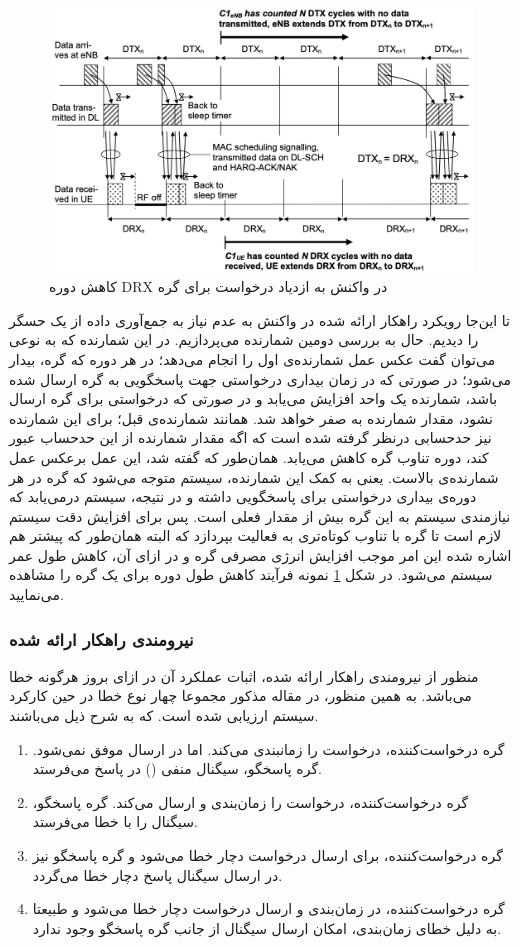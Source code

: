 \begin{figure}
	\centering
	\includegraphics[width=0.7\linewidth]{figs/cdd-extend}
	\caption {کاهش دوره DRX در واکنش به ازدیاد درخواست برای گره}
	\label{fig:cdd-reduce}
\end{figure}

\par
تا این‌جا رویکرد راهکار ارائه شده در واکنش به عدم نیاز به جمع‌آوری داده از یک حسگر را دیدیم. حال به بررسی دومین شمارنده می‌پردازیم. در این شمارنده که به نوعی می‌توان گفت عکس عمل شمارنده‌ی اول را انجام می‌دهد؛ در هر دوره که گره، بیدار می‌شود؛ در صورتی که در زمان بیداری درخواستی جهت پاسخگویی به گره ارسال شده باشد، شمارنده یک واحد افزایش می‌یابد و در صورتی که درخواستی برای گره ارسال نشود، مقدار شمارنده به صفر  خواهد شد. همانند شمارنده‌ی قبل؛ برای این شمارنده نیز حدحسابی درنظر گرفته شده است که اگه مقدار شمارنده از این حدحساب عبور کند، دوره تناوب گره کاهش می‌یابد. همان‌طور که گفته شد، این عمل برعکس عمل شمارنده‌ی بالاست. یعنی به کمک این شمارنده، سیستم متوجه می‌شود که گره در هر دوره‌ی بیداری درخواستی برای پاسخگویی داشته و در نتیجه، سیستم درمی‌یابد که نیازمندی سیستم به این گره بیش از مقدار فعلی است. پس برای افزایش دقت سیستم لازم است تا گره با تناوب کوتاه‌تری به فعالیت بپردازد  که البته همان‌طور که پیشتر هم اشاره شده این امر موجب افزایش انرژی مصرفی گره و در ازای آن، کاهش طول عمر سیستم می‌شود. در شکل \ref{fig:cdd-reduce} نمونه فرآیند کاهش طول دوره برای یک گره را مشاهده می‌نمایید.

\subsubsection{نیرومندی راهکار ارائه شده}
منظور از نیرومندی راهکار ارائه شده، اثبات عملکرد آن در ازای بروز هرگونه خطا می‌باشد. به همین منظور، در مقاله مذکور مجموعا چهار نوع خطا در حین کارکرد سیستم ارزیابی شده است. که به شرح ذیل می‌باشند.
\begin{enumerate}
	\item{
	گره درخواست‌کننده، درخواست را زمانبندی می‌کند. اما در ارسال موفق نمی‌شود. گره پاسخگو، سیگنال منفی () در پاسخ می‌فرستد.
	}
	\item{
	گره درخواست‌کننده، درخواست را زمان‌بندی و ارسال می‌کند. گره پاسخگو، سیگنال را با خطا می‌فرستد.
	}
	\item{
گره درخواست‌کننده، برای ارسال درخواست دچار خطا می‌شود و گره پاسخگو نیز در ارسال سیگنال پاسخ دچار خطا می‌گردد.
	}
	\item{
گره درخواست‌کننده، در زمان‌بندی و ارسال درخواست دچار خطا می‌شود و طبیعتا به دلیل خطای زمان‌بندی، امکان ارسال سیگنال از جانب گره پاسخگو وجود ندارد.
	}
\end{enumerate}

